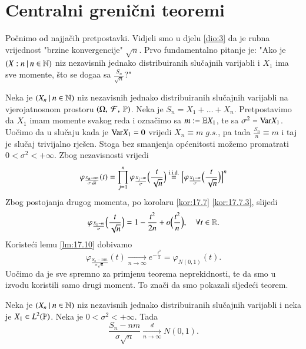 
\chapter{Centralni greni\v cni teoremi}

Po\v cnimo od najja\v cih pretpostavki.
Vidjeli smo u djelu \ref{dio:3} da je rubna vrijednost "brzine konvergencije" $\sqrt{n}$.
Prvo fundamentalno pitanje je: "Ako je $({X:n} \: | \: {n \in \mathbb{N}})$ niz nezavisnih jednako distribuiranih slu\v cajnih varijabli i $X_1$ ima sve momente, \v sto se doga\dj a sa $\frac{S_n}{\sqrt{n}}$?"

Neka je $({X_n} \: | \: {n \in \mathbb{N}})$ niz nezavisnih jednako distribuiranih slu\v cajnih varijabli na vjerojatnosnom prostoru $(\Omega, \: \mathcal{F}, \: \mathbb{P})$.
Neka je $S_n = X_1 + \ldots + X_n$.
Pretpostavimo da $X_1$ imam momente svakog reda i ozna\v cimo sa $m:= \mathbb{E} X_1$, te sa $\sigma^2 = \mathrm{Var} X_1$.
Uo\v cimo da u slu\v caju kada je $\mathrm{Var} X_1 = 0$ vrijedi $X_n \equiv m \; g.s.$, pa tada $\frac{S_n}{n} \equiv m$ i taj je slu\v caj trivijalno rje\v sen.
Stoga bez smanjenja op\' cenitosti mo\v zemo promatrati $0 < \sigma^2 < +\infty$.
Zbog nezavisnosti vrijedi
\begin{equation*}
    \varphi_{\frac{S_n - m n}{\sigma \sqrt{n}}} (t) = \prod\limits_{j = 1}^{n} \varphi_{\frac{X_j - m}{\sigma}} \Big( \frac{t}{\sqrt{n}} \Big) \overset{\mathrm{i.i.d.}}{=} \Big[ \varphi_{\frac{X_1 - m}{\sigma}} \Big( \frac{t}{\sqrt{n}} \Big) \Big]^n
\end{equation*}
Zbog postojanja drugog momenta, po korolaru \ref{kor:17.7} \ref{kor:17.7.3}, slijedi
\begin{equation*}
    \varphi_{\frac{X_1 - m}{\sigma}} \Big( \frac{t}{\sqrt{n}} \Big) = 1 - \frac{t^2}{2 n} + o \Big( \frac{t^2}{n} \Big), \quad \forall t \in \mathbb{R}.
\end{equation*}
Koriste\' ci lemu \ref{lm:17.10} dobivamo
\begin{equation*}
    \varphi_{\frac{S_n - n m}{\sigma \sqrt{n}}} (t) \xrightarrow[n \to \infty]{} e^{-\frac{t^2}{2}} = \varphi_{N(0,1)} (t).
\end{equation*}
Uo\v cimo da je sve spremno za primjenu teorema neprekidnosti, te da smo u izvodu koristili samo drugi moment.
To zna\v ci da smo pokazali sljede\' ci teorem.

\begin{tm}  \label{tm:19.1}
    \quad \newline
    Neka je $({X_n} \: | \: {n \in \mathbb{N}})$ niz nezavisnih jednako distribuiranih slu\v cajnih varijabli i neka je $X_1 \in L^2 (\mathbb{P})$.
    Neka je $0 < \sigma^2 < +\infty$.
    Tada
    \begin{equation*}
        \frac{S_n - n m}{\sigma \sqrt{n}} \xrightarrow[n \to \infty]{d} N (0, 1).
    \end{equation*}    
\end{tm}

